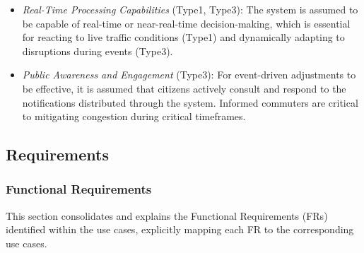 \documentclass[a4paper,12pt]{article}
\begin{document}
\begin{itemize}
    \item \textit{Real-Time Processing Capabilities} (Type1, Type3): The system is assumed to be capable of real-time or near-real-time decision-making, which is essential for reacting to live traffic conditions (Type1) and dynamically adapting to disruptions during events (Type3).

    \item \textit{Public Awareness and Engagement} (Type3): For event-driven adjustments to be effective, it is assumed that citizens actively consult and respond to the notifications distributed through the system. Informed commuters are critical to mitigating congestion during critical timeframes.
    
\end{itemize}

\newpage

\subsection{Requirements}

\subsubsection{Functional Requirements}

This section consolidates and explains the Functional Requirements (FRs) identified within the use cases, explicitly mapping each FR to the corresponding use cases. \\
\end{document}
